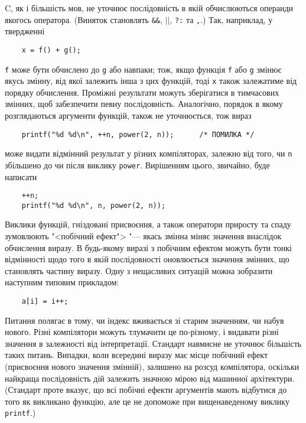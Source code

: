 \documentclass[a4paper,12pt]{book}
\begin{document}
  C, як і більшість мов, не уточнює послідовність в якій обчислюються операнди якогось
  оператора. (Виняток становлять \texttt{\&\&}, \texttt{\mbox{$|$}\mbox{$|$}}, \texttt{?:} та
  \texttt{,}.) Так, наприклад, у твердженні
  \begin{verbatim}
    x = f() + g();
  \end{verbatim}
  \texttt{f} може бути обчислено до \texttt{g} або навпаки; тож, якщо функція \texttt{f}
  або \texttt{g} змінює якусь змінну, від якої залежить інша з цих функцій, тоді
  \texttt{x} також залежатиме від порядку обчислення. Проміжні результати можуть
  зберігатися в тимчасових змінних, щоб забезпечити певну послідовність. Аналогічно,
  порядок в якому розглядаються аргументи функцій, також не уточнюється, тож вираз
  \begin{verbatim}
    printf("%d %d\n", ++n, power(2, n));      /* ПОМИЛКА */
  \end{verbatim}
  може видати відмінний результат у різних компіляторах, залежно від того, чи \texttt{n}
  збільшено до чи після виклику \texttt{power}. Вирішенням цього, звичайно, буде написати
  \begin{verbatim}
    ++n;
    printf("%d %d\n", n, power(2, n));
  \end{verbatim}

  Виклики функцій, гніздовані присвоєння, а також оператори приросту та спаду зумовлюють
  "<побічний ефект"> "--- якась змінна міняє значення внаслідок обчислення
  виразу. В будь-якому виразі з побічним ефектом можуть бути тонкі відмінності щодо того в
  якій послідовності оновлюється значення змінних, що становлять частину виразу. Одну з
  нещасливих ситуацій можна зобразити наступним типовим прикладом:
  \begin{verbatim}
    a[i] = i++;
  \end{verbatim}

  Питання полягає в тому, чи індекс вживається зі старим значенням, чи набув нового.
  Різні компілятори можуть тлумачити це по-різному, і видавати різні значення в
  залежності від інтерпретації. Стандарт навмисне не уточнює більшість таких питань.
  Випадки, коли всередині виразу має місце побічний ефект (присвоєння нового значення
  змінній), залишено на розсуд компілятора, оскільки найкраща послідовність дій залежить
  значною мірою від машинної архітектури. (Стандарт проте вказує, що всі побічні ефекти
  аргументів мають відбутися до того як викликано функцію, але це не допоможе при
  вищенаведеному виклику \texttt{printf}.)
\end{document}
